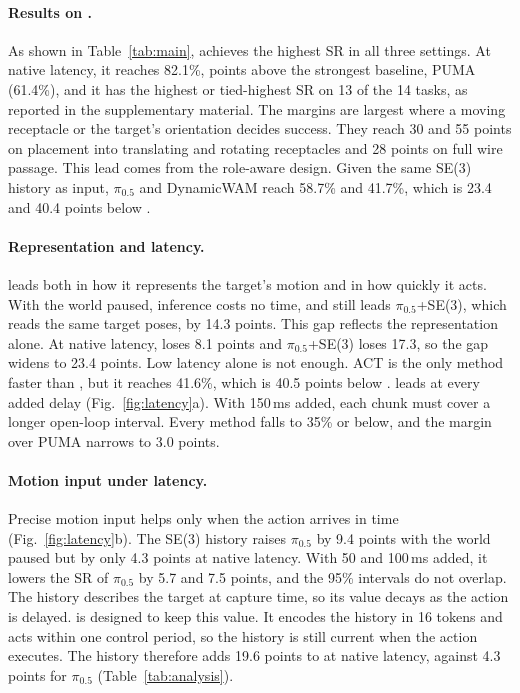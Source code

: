 \paragraph{Results on \bench.}
As shown in Table~\ref{tab:main}, \ours achieves the highest SR in all three settings.
At native latency, it reaches 82.1\%, \nativeLead{} points above the strongest baseline, PUMA
(61.4\%), and it has the highest or tied-highest SR on 13 of the 14 tasks, as
reported in the supplementary material. The margins are largest where a moving receptacle
or the target's orientation decides success. They reach 30 and 55 points on placement
into translating and rotating receptacles and 28 points on full wire passage. This
lead comes from the role-aware design. Given the same SE(3) history as input,
$\pi_{0.5}$ and DynamicWAM reach 58.7\% and 41.7\%, which is 23.4 and 40.4 points below
\ours.

\paragraph{Representation and latency.}
\ours leads both in how it represents the target's motion and in how quickly it acts.
With the world paused, inference costs no time, and \ours
still leads $\pi_{0.5}$+SE(3), which reads the same target poses, by 14.3 points. This
gap reflects the representation alone. At native latency, \ours loses 8.1 points and
$\pi_{0.5}$+SE(3) loses 17.3, so the gap widens to 23.4 points. Low latency alone is not
enough. ACT is the only method faster than \ours, but it reaches 41.6\%, which is 40.5
points below \ours. \ours leads at every added delay (Fig.~\ref{fig:latency}a). With 150\,ms
added, each chunk must cover a longer open-loop interval. Every method falls to
35\% or below, and the margin over PUMA narrows to 3.0 points.



\paragraph{Motion input under latency.}
Precise motion input helps only when the action arrives in time
(Fig.~\ref{fig:latency}b). The SE(3) history raises $\pi_{0.5}$ by 9.4 points with the
world paused but by only 4.3 points at native latency. With 50 and 100\,ms added, it
lowers the SR of $\pi_{0.5}$ by 5.7 and 7.5 points, and the 95\% intervals do not
overlap. The history describes the target at capture time, so its value decays as the
action is delayed. \ours is designed to keep this value. It encodes the history
in 16 tokens and acts within one control period, so the history is still current when
the action executes. The history therefore adds 19.6 points to \ours at native latency,
against 4.3 points for $\pi_{0.5}$ (Table~\ref{tab:analysis}).

